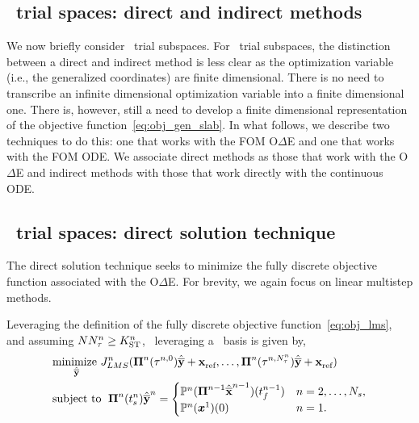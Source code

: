 \subsection{\spaceTimeAcronym\ trial spaces: direct and indirect methods}
We now briefly consider \spaceTimeAcronym\ trial subspaces. 
For \spaceTimeAcronym\ trial subspaces, the distinction between a direct and indirect method is less clear as the optimization variable (i.e., the generalized coordinates) are finite 
dimensional. There is no need to transcribe an infinite dimensional optimization variable into a finite dimensional one. There is, however, still a need to develop a finite 
dimensional representation of the objective function~\eqref{eq:obj_gen_slab}. In what follows, we describe two techniques to do this: one that works with the FOM O$\Delta$E and one that works with the FOM ODE. We associate direct methods as those 
that work with the O$\Delta$E and indirect methods with those that work directly with the continuous ODE.  

\subsection{\spaceTimeAcronym\ trial spaces: direct solution technique}
The direct solution technique seeks to minimize the fully discrete objective function associated with the O$\Delta$E. For brevity, we again focus on linear multistep methods. 


Leveraging the definition of the fully discrete objective function~\eqref{eq:obj_lms}, and assuming $N \nstepsArg{n} \ge \stdimArg{n}$, \methodAcronym\ leveraging a \spaceTimeAcronym\ basis is given by, 
 \begin{equation}\label{eq:obj_gen_lms_final_st}
\begin{split}
& \underset{\stgenstatey}{\text{minimize } }
\objectiveArgLMS{n} (\stbasisArg{n}{\timeWindowArg{n}{0}} \stgenstatey + \stateInterceptArg{n},\ldots,\stbasisArg{n}{\timeWindowArg{n}{\nstepsArg{n}}} \stgenstatey + \stateInterceptArg{n})  \\
&\text{subject to } \;  \stbasisArg{n}{\timeStartArg{n}}\stgenstateyArg{n} = \begin{cases} 
\mathbb{P}^n(\stbasisArgnt{n-1}\stgenstateArg{n-1})(\timeEndArg{n-1}) & n = 2,\ldots,\nslabs, \\ 
\mathbb{P}^n(\stateFOMArgnt{1})(0) &
n=1. \end{cases}\end{split} 
\end{equation}


